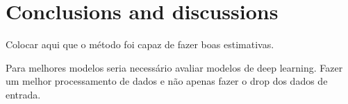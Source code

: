 \section{Conclusions and discussions}
\label{sec:Conclusions}


Colocar aqui que o método foi capaz de fazer boas estimativas. 

Para melhores modelos seria necessário avaliar modelos de deep learning.
Fazer um melhor processamento de dados e não apenas fazer o drop dos dados de entrada.
